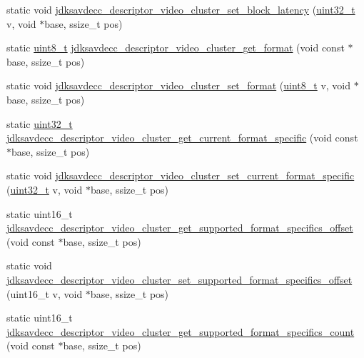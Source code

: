 \begin{DoxyCompactItemize}
\item 
static void \hyperlink{group__descriptor__video__cluster_ga1ac3418ff127705510f8af413f5678d1}{jdksavdecc\+\_\+descriptor\+\_\+video\+\_\+cluster\+\_\+set\+\_\+block\+\_\+latency} (\hyperlink{parse_8c_a6eb1e68cc391dd753bc8ce896dbb8315}{uint32\+\_\+t} v, void $\ast$base, ssize\+\_\+t pos)
\item 
static \hyperlink{stdint_8h_aba7bc1797add20fe3efdf37ced1182c5}{uint8\+\_\+t} \hyperlink{group__descriptor__video__cluster_ga116bf799b564ad0a9373d2758c02c970}{jdksavdecc\+\_\+descriptor\+\_\+video\+\_\+cluster\+\_\+get\+\_\+format} (void const $\ast$base, ssize\+\_\+t pos)
\item 
static void \hyperlink{group__descriptor__video__cluster_ga38fb4d45f49979e22c2199655252037d}{jdksavdecc\+\_\+descriptor\+\_\+video\+\_\+cluster\+\_\+set\+\_\+format} (\hyperlink{stdint_8h_aba7bc1797add20fe3efdf37ced1182c5}{uint8\+\_\+t} v, void $\ast$base, ssize\+\_\+t pos)
\item 
static \hyperlink{parse_8c_a6eb1e68cc391dd753bc8ce896dbb8315}{uint32\+\_\+t} \hyperlink{group__descriptor__video__cluster_gab7ec9de12822574a1ce9fc412a95d408}{jdksavdecc\+\_\+descriptor\+\_\+video\+\_\+cluster\+\_\+get\+\_\+current\+\_\+format\+\_\+specific} (void const $\ast$base, ssize\+\_\+t pos)
\item 
static void \hyperlink{group__descriptor__video__cluster_gaba5f5bf958ce581ac4e700805b16b377}{jdksavdecc\+\_\+descriptor\+\_\+video\+\_\+cluster\+\_\+set\+\_\+current\+\_\+format\+\_\+specific} (\hyperlink{parse_8c_a6eb1e68cc391dd753bc8ce896dbb8315}{uint32\+\_\+t} v, void $\ast$base, ssize\+\_\+t pos)
\item 
static uint16\+\_\+t \hyperlink{group__descriptor__video__cluster_ga445ef3ac60b388432047f1932fc03b15}{jdksavdecc\+\_\+descriptor\+\_\+video\+\_\+cluster\+\_\+get\+\_\+supported\+\_\+format\+\_\+specifics\+\_\+offset} (void const $\ast$base, ssize\+\_\+t pos)
\item 
static void \hyperlink{group__descriptor__video__cluster_ga864e74a736357aa426e4cc6d7b1d0949}{jdksavdecc\+\_\+descriptor\+\_\+video\+\_\+cluster\+\_\+set\+\_\+supported\+\_\+format\+\_\+specifics\+\_\+offset} (uint16\+\_\+t v, void $\ast$base, ssize\+\_\+t pos)
\item 
static uint16\+\_\+t \hyperlink{group__descriptor__video__cluster_ga9881306b0820e456f489b07af0b41db8}{jdksavdecc\+\_\+descriptor\+\_\+video\+\_\+cluster\+\_\+get\+\_\+supported\+\_\+format\+\_\+specifics\+\_\+count} (void const $\ast$base, ssize\+\_\+t pos)
\item 

\end{DoxyCompactItemize}
